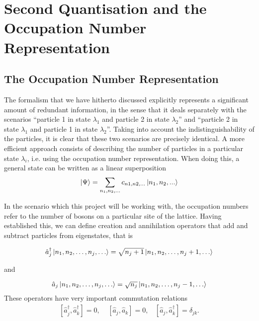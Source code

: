 \documentclass[a4paper,10pt]{article}
\begin{document}
\section{Second Quantisation and the Occupation Number Representation}
\subsection{The Occupation Number Representation}
The formalism that we have hitherto discussed explicitly represents a significant amount of redundant information, in the sense that it deals separately with the scenarios ``particle 1 in state $\lambda_1$ and 
particle 2 in state $\lambda_2$'' and ``particle 2 in state $\lambda_1$ and particle 1 in state $\lambda_2$''. Taking into account the indistinguishability of the particles, it is clear that these two scenarios
are precisely identical. A more efficient approach consists of describing the number of particles in a particular state $\lambda_i$, i.e. using the occupation number representation. When doing this, a general 
state can be written as a linear superposition
\begin{equation}
 \ket{\Psi}=\sum_{n_1,n_2,...}c_{n1,n2,...}\ket{n_1,n_2,...}
\end{equation}

In the scenario which this project will be working with, the occupation numbers refer to the number of bosons on a particular site of the lattice.
Having established this, we can define creation and annihilation operators that add and subtract particles from eigenstates, that is

\begin{equation}
 \hat{a}_{j}^{\dagger}\ket{n_1,n_2,\dots,n_{j},\dots}=\sqrt{n_j+1}\ket{n_1,n_2,\dots,n_{j}+1,\dots}
\end{equation}

and 

\begin{equation}
 \hat{a}_{j}\ket{n_1,n_2,\dots,n_{j},\dots}=\sqrt{n_j}\ket{n_1,n_2,\dots,n_{j}-1,\dots}
\end{equation}
These operators have very important commutation relations
\begin{equation}
\begin{align*}
 [\hat{a}_{j}^{\dagger},\hat{a}_{k}^{\dagger}]=0, \ \ \ \ \ [\hat{a}_{j},\hat{a}_{k}]=0,\ \ \ \ [\hat{a}_{j},\hat{a}_{k}^{\dagger}]=\delta_{jk}.
 \end{align*}
\end{equation}
\end{document}
